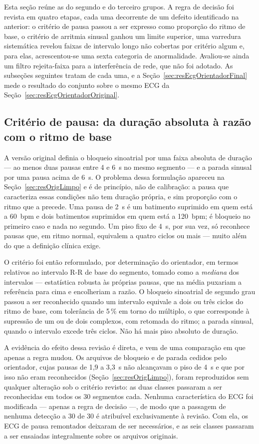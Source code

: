 Esta seção reúne as do segundo e do terceiro grupos. A regra de decisão foi revista em
quatro etapas, cada uma decorrente de um defeito identificado na anterior: o critério de
pausa passou a ser expresso como proporção do ritmo de base, o critério de arritmia sinusal
ganhou um limite superior, uma varredura sistemática revelou faixas de intervalo longo não
cobertas por critério algum e, para elas, acrescentou-se uma sexta categoria de
anormalidade. Avaliou-se ainda um filtro rejeita-faixa para a interferência de rede, que não
foi adotado. As subseções seguintes tratam de cada uma, e a
Seção~\ref{sec:resEcgOrientadorFinal} mede o resultado do conjunto sobre o mesmo \acs{ECG}
da Seção~\ref{sec:resEcgOrientadorOriginal}.

\subsection{Critério de pausa: da duração absoluta à razão com o ritmo de base}
\label{sec:resCriterioPausa}

A versão original definia o bloqueio sinoatrial por uma faixa absoluta de duração --- ao
menos duas pausas entre 4 e 6~s no mesmo segmento --- e a parada sinusal por uma pausa acima
de 6~s. O problema dessa formulação apareceu na Seção~\ref{sec:resOrigLimpo} e é de
princípio, não de calibração: a pausa que caracteriza essas condições não tem duração
própria, e sim proporção com o ritmo que a precede. Uma pausa de 2~s é um batimento
suprimido em quem está a 60~bpm e dois batimentos suprimidos em quem está a 120~bpm; é
bloqueio no primeiro caso e nada no segundo. Um piso fixo de 4~s, por sua vez, só reconhece
pausas que, em ritmo normal, equivalem a quatro ciclos ou mais --- muito além do que a
definição clínica exige.

O critério foi então reformulado, por determinação do orientador, em termos relativos ao
intervalo R-R de base do segmento, tomado como a \emph{mediana} dos intervalos --- estatística
robusta às próprias pausas, que na média puxariam a referência para cima e encolheriam a
razão. O bloqueio sinoatrial de segundo grau passou a ser reconhecido quando um intervalo
equivale a dois ou três ciclos do ritmo de base, com tolerância de 5\,\% em torno do
múltiplo, o que corresponde à supressão de um ou de dois complexos, com retomada do ritmo; a
parada sinusal, quando o intervalo excede três ciclos. Não há mais piso absoluto de duração.

A evidência do efeito dessa revisão é direta, e vem de uma comparação em que apenas a regra
mudou. Os arquivos de bloqueio e de parada cedidos pelo orientador, cujas pausas de 1,9 a
3,3~s não alcançavam o piso de 4~s e que por isso não eram reconhecidos
(Seção~\ref{sec:resOrigLimpo}), foram reproduzidos sem qualquer alteração sob o critério
revisto: as duas classes passaram a ser reconhecidas em todos os 30 segmentos cada. Nenhuma
característica do \acs{ECG} foi modificada --- apenas a regra de decisão ---, de modo que a
passagem de nenhuma detecção a 30 de 30 é atribuível exclusivamente à revisão. Com ela, os
\acs{ECG} de pausa remontados deixaram de ser necessários, e as seis classes passaram a ser
ensaiadas integralmente sobre os arquivos originais.

